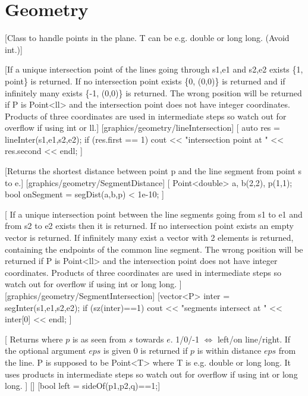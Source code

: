 
\chapter{Geometry}


[Class to handle points in the plane. T can be e.g. double or long long. (Avoid int.)]

[If a unique intersection point of the lines going through s1,e1 and s2,e2 exists \{1, point\} is returned. 
If no intersection point exists \{0, (0,0)\} is returned and if infinitely many exists \{-1, (0,0)\} is returned. 
The wrong position will be returned if P is Point<ll> and the intersection point does not have integer coordinates. 
Products of three coordinates are used in intermediate steps so watch out for overflow if using int or ll.]%
[graphics/geometry/lineIntersection]
[
    auto res = lineInter(s1,e1,s2,e2);
 	if (res.first == 1)
		cout << "intersection point at " << res.second << endl;
]


[Returns the shortest distance between point p and the line segment from point s to e.]
[graphics/geometry/SegmentDistance]
[
    Point<double> a, b(2,2), p(1,1);
 	bool onSegment = segDist(a,b,p) < 1e-10;
]

[
If a unique intersection point between the line segments going from s1 to e1 and from s2 to e2 exists then it is returned.
If no intersection point exists an empty vector is returned.
If infinitely many exist a vector with 2 elements is returned, containing the endpoints of the common line segment.
The wrong position will be returned if P is Point<ll> and the intersection point does not have integer coordinates.
Products of three coordinates are used in intermediate steps so watch out for overflow if using int or long long.
]
[graphics/geometry/SegmentIntersection]
[vector<P> inter = segInter(s1,e1,s2,e2);
 if (sz(inter)==1)
   cout << "segments intersect at " << inter[0] << endl;
]

[
 Returns where $p$ is as seen from $s$ towards $e$. 1/0/-1 $\Leftrightarrow$ left/on line/right.
 If the optional argument $eps$ is given 0 is returned if $p$ is within distance $eps$ from the line.
 P is supposed to be Point<T> where T is e.g. double or long long.
 It uses products in intermediate steps so watch out for overflow if using int or long long.
]
[]
[bool left = sideOf(p1,p2,q)==1;]

